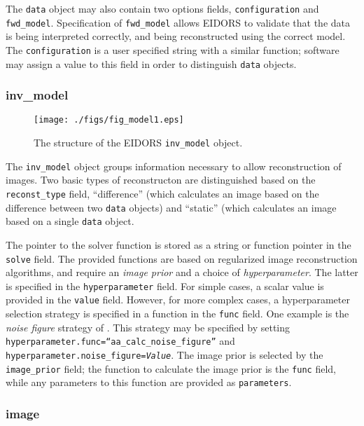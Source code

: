 \documentclass[12pt]{iopart}
\begin{document}
The {\tt data} object may also contain two options fields,
{\tt configuration} and {\tt fwd\_model}. Specification
of {\tt fwd\_model} allows EIDORS to validate that the
data is being interpreted correctly, and being reconstructed
using the correct model. The {\tt configuration} is
a user specified string with a similar function; software
may assign a value to this field in order to distinguish
{\tt data} objects.


\subsubsection{inv\_model}

%
%
\begin{figure}[th]
\begin{flushright}
\texttt{[image: ./figs/fig\_model1.eps]}
\caption{\small The structure of the EIDORS {\tt inv\_model} object.
\label{fig:inv_model}
 }
\end{flushright}
\end{figure}

The {\tt inv\_model} object groups information necessary to 
allow reconstruction of images. Two basic types of reconstructon
are distinguished based on the {\tt reconst\_type} field, 
``difference'' (which calculates an image based on the difference
between two {\tt data} objects) and ``static'' (which calculates an
image based on a single {\tt data} object.

The pointer to the solver function is stored as a string or function
pointer in the {\tt solve} field. The provided functions are based
on regularized image reconstruction algorithms, and require 
an {\em image prior} and a choice of {\em hyperparameter}. 
The latter is specified in the {\tt hyperparameter} field. For
simple cases, a scalar value is provided in the {\tt value} field.
However, for more complex cases, a hyperparameter selection strategy
is specified in a function in the {\tt func} field. One example
is the {\em noise figure} strategy of \cite{Adler_and_Guardo_1996}.
This strategy may be specified by setting
 {\tt hyperparameter.func=``aa\_calc\_noise\_figure''}
and 
 {\tt hyperparameter.noise\_figure=\em Value}.
The image prior is selected by the {\tt image\_prior} field;
the function to calculate the image prior is the {\tt func}
field, while
any parameters to this function are provided as {\tt parameters}.

\subsubsection{image}
\end{document}
